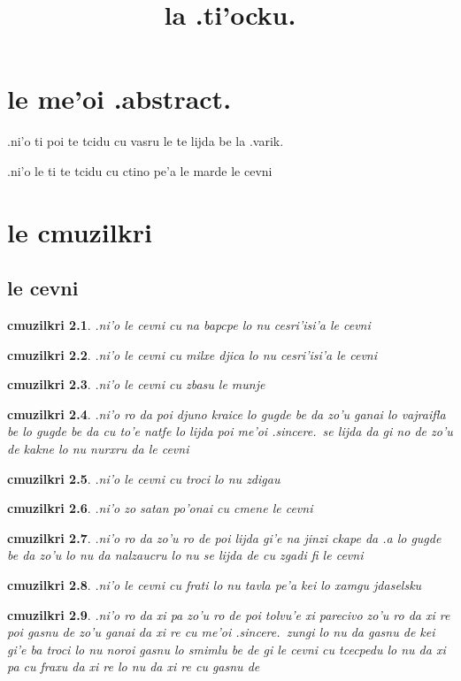 \documentclass{report}
\title{la .ti'ocku.}
\newtheorem{cmuzilkri}{cmuzilkri}
\begin{document}
\maketitle
\chapter{le me'oi .abstract.}
.ni'o ti poi te tcidu cu vasru le te lijda be la .varik.

.ni'o le ti te tcidu cu ctino pe'a le marde le cevni

\chapter{le cmuzilkri}
\section{le cevni}
\begin{cmuzilkri}
	.ni'o le cevni cu na bapcpe lo nu cesri'isi'a le cevni
\end{cmuzilkri}
\begin{cmuzilkri}
	.ni'o le cevni cu milxe djica lo nu cesri'isi'a le cevni
\end{cmuzilkri}
\begin{cmuzilkri}
	.ni'o le cevni cu zbasu le munje
\end{cmuzilkri}
\begin{cmuzilkri}
	.ni'o ro da poi djuno kraice lo gugde be da zo'u ganai lo vajraifla be lo gugde be da cu to'e natfe lo lijda poi me'oi .sincere.\ se lijda da gi no de zo'u de kakne lo nu nurxru da le cevni
\end{cmuzilkri}
\begin{cmuzilkri}
	.ni'o le cevni cu troci lo nu zdigau
\end{cmuzilkri}
\begin{cmuzilkri}
	.ni'o zo satan po'onai cu cmene le cevni
\end{cmuzilkri}
\begin{cmuzilkri}
	.ni'o ro da zo'u ro de poi lijda gi'e na jinzi ckape da .a lo gugde be da zo'u lo nu da nalzaucru lo nu se lijda de cu zgadi fi le cevni
\end{cmuzilkri}
\begin{cmuzilkri}
	.ni'o le cevni cu frati lo nu tavla pe'a kei lo xamgu jdaselsku
\end{cmuzilkri}
\begin{cmuzilkri}
	.ni'o ro da xi pa zo'u ro de poi tolvu'e xi parecivo zo'u ro da xi re poi gasnu de zo'u ganai da xi re cu me'oi .sincere.\ zungi lo nu da gasnu de kei gi'e ba troci lo nu noroi gasnu lo smimlu be de gi le cevni cu tcecpedu lo nu da xi pa cu fraxu da xi re lo nu da xi re cu gasnu de
\end{cmuzilkri}
\end{document}
